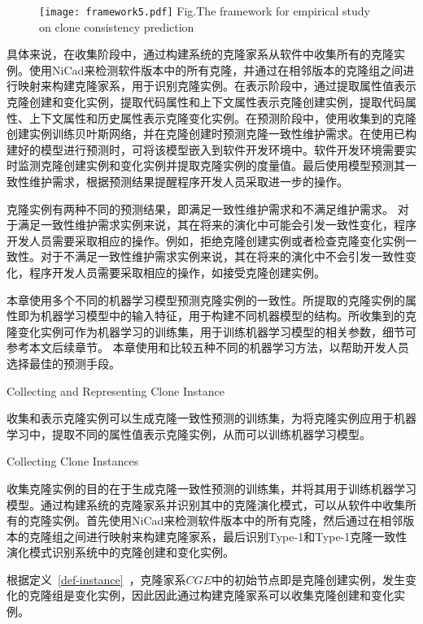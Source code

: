 \begin{figure}[htbp]
\centering
\texttt{[image: framework5.pdf]}
{Fig.$\!$}{The framework for empirical study on clone consistency prediction }
\vspace{-1em}
\end{figure}

具体来说，在收集阶段中，通过构建系统的克隆家系从软件中收集所有的克隆实例。使用NiCad来检测软件版本中的所有克隆，并通过在相邻版本的克隆组之间进行映射来构建克隆家系，用于识别克隆实例。在表示阶段中，通过提取属性值表示克隆创建和变化实例，提取代码属性和上下文属性表示克隆创建实例，提取代码属性、上下文属性和历史属性表示克隆变化实例。在预测阶段中，使用收集到的克隆创建实例训练贝叶斯网络，并在克隆创建时预测克隆一致性维护需求。在使用已构建好的模型进行预测时，可将该模型嵌入到软件开发环境中。软件开发环境需要实时监测克隆创建实例和变化实例并提取克隆实例的度量值。最后使用模型预测其一致性维护需求，根据预测结果提醒程序开发人员采取进一步的操作。

克隆实例有两种不同的预测结果，即满足一致性维护需求和不满足维护需求。
对于满足一致性维护需求实例来说，其在将来的演化中可能会引发一致性变化，程序开发人员需要采取相应的操作。例如，拒绝克隆创建实例或者检查克隆变化实例一致性。对于不满足一致性维护需求实例来说，其在将来的演化中不会引发一致性变化，程序开发人员需要采取相应的操作，如接受克隆创建实例。

本章使用多个不同的机器学习模型预测克隆实例的一致性。所提取的克隆实例的属性即为机器学习模型中的输入特征，用于构建不同机器模型的结构。所收集到的克隆变化实例可作为机器学习的训练集，用于训练机器学习模型的相关参数，细节可参考本文后续章节。
本章使用和比较五种不同的机器学习方法，以帮助开发人员选择最佳的预测手段。


{Collecting and Representing Clone Instance}

收集和表示克隆实例可以生成克隆一致性预测的训练集，为将克隆实例应用于机器学习中，提取不同的属性值表示克隆实例，从而可以训练机器学习模型。

{Collecting Clone Instances}

收集克隆实例的目的在于生成克隆一致性预测的训练集，并将其用于训练机器学习模型。通过构建系统的克隆家系并识别其中的克隆演化模式，可以从软件中收集所有的克隆实例。首先使用NiCad来检测软件版本中的所有克隆，然后通过在相邻版本的克隆组之间进行映射来构建克隆家系，最后识别Type-1和Type-1克隆一致性演化模式识别系统中的克隆创建和变化实例。

根据定义~\ref{def-instance}~，克隆家系$CGE$中的初始节点即是克隆创建实例，发生变化的克隆组是变化实例，因此因此通过构建克隆家系可以收集克隆创建和变化实例。

